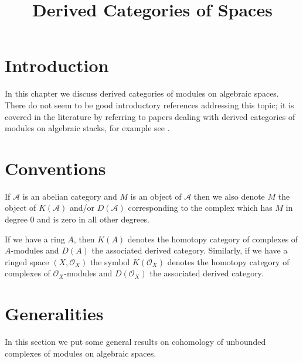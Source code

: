 

%


\title{Derived Categories of Spaces}


\maketitle

\label{section-phantom}

\tableofcontents

\section{Introduction}
\label{section-introduction}

\noindent
In this chapter we discuss derived categories of modules on algebraic spaces.
There do not seem to be good introductory references addressing this topic;
it is covered in the literature by referring to papers dealing with derived
categories of modules on algebraic stacks, for example see
\cite{olsson_sheaves}.



\section{Conventions}
\label{section-conventions}

\noindent
If $\mathcal{A}$ is an abelian category and $M$ is an object
of $\mathcal{A}$ then we also denote $M$ the object of $K(\mathcal{A})$
and/or $D(\mathcal{A})$ corresponding to the complex which has
$M$ in degree $0$ and is zero in all other degrees.

\medskip\noindent
If we have a ring $A$, then $K(A)$ denotes the homotopy category
of complexes of $A$-modules and $D(A)$ the associated derived category.
Similarly, if we have a ringed space $(X, \mathcal{O}_X)$ the symbol
$K(\mathcal{O}_X)$ denotes the homotopy category of complexes of
$\mathcal{O}_X$-modules and $D(\mathcal{O}_X)$ the associated derived
category.





\section{Generalities}
\label{section-generalities}

\noindent
In this section we put some general results on cohomology of unbounded
complexes of modules on algebraic spaces.

